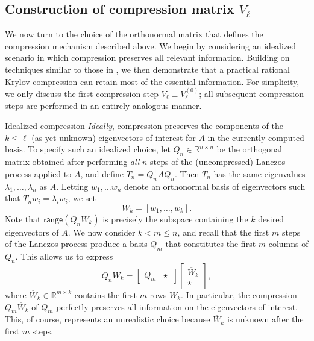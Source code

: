 \documentclass{siamart190516}
\newcommand{\Ttran}{\mathsf{T}}
\newcommand{\R}{\mathbb{R}}
\newcommand{\range}{\mathsf{range}}
\begin{document}
\subsection{Construction of compression matrix $V_{\ell}$}
\label{sec:Vell}

We now turn to the choice of the orthonormal matrix that defines the compression mechanism described above. We begin by considering an idealized scenario in which compression preserves all relevant information. Building on techniques similar to those in \cite{casulli2024low}, we then demonstrate that a practical rational Krylov compression can retain most of the essential information.
For simplicity, we only discuss the first compression step $V_{\ell} \equiv V^{(0)}_{\ell}$; all subsequent compression steps are performed in an entirely analogous manner.

\begin{paragraph}{Idealized compression}
\emph{Ideally}, compression preserves
the components of the $k\le \ell$ (as yet unknown) eigenvectors of interest for $A$ in the currently computed basis. To specify such an idealized choice,
let $Q_{n}\in \R^{n \times n}$ be the orthogonal matrix obtained  after performing \emph{all} $n$ steps of the (uncompressed) Lanczos process applied to $A$, and define $T_{n}=Q_{n}^{\Ttran}AQ_{n}$.
Then $T_n$ has the same eigenvalues $\lambda_1,\ldots,\lambda_n$ as $A$. Letting $w_1,\ldots w_n$ denote an orthonormal basis of eigenvectors such that $T_{n} w_i = \lambda_i w_i$, we set
\[
 W_{k}=[w_{1},\dotsc,w_{k}].
\]
Note that $\range(Q_{n}W_{k})$ is precisely the subspace containing the $k$ desired  eigenvectors of $A$. We now consider $k< m\leq n$, and
recall that the first $m$ steps of the Lanczos process produce a basis $Q_{m}$ that constitutes the first $m$ columns of $Q_{n}$. This allows us to express
\[
 Q_{n}W_{k} = \begin{bmatrix}
               Q_m & \star\ 
              \end{bmatrix}
\begin{bmatrix}
               \overline{W}_{k} \\ \star
\end{bmatrix},
\]
where $\overline{W}_{k}\in\R^{m\times k}$ contains the first $m$ rows $W_{k}$.
In particular, the compression $Q_{m} \overline{W}_{k}$ of $Q_{m}$ perfectly preserves all information on the eigenvectors of interest.
This, of course, represents an unrealistic choice because $\overline{W}_{k}$ is unknown after the first $m$ steps.
\end{paragraph}
\end{document}
